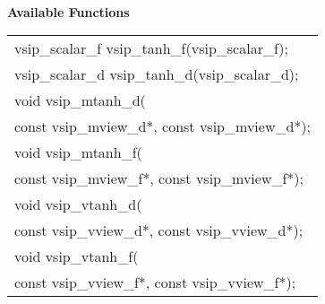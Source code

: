 \\\cvsiplh
\newline \hspace*{.8cm} \vspace*{.1cm} \textbf{Available Functions }
\newline \hspace*{1.1cm} {
\ttfamily
\begin{tabular}[H]{l}
vsip\_scalar\_f vsip\_tanh\_f(vsip\_scalar\_f);\\
vsip\_scalar\_d vsip\_tanh\_d(vsip\_scalar\_d);\\
void vsip\_mtanh\_d(\\*\hspace{1cm}const vsip\_mview\_d*, const vsip\_mview\_d*);\\
void vsip\_mtanh\_f(\\*\hspace{1cm}const vsip\_mview\_f*, const vsip\_mview\_f*);\\
void vsip\_vtanh\_d(\\*\hspace{1cm}const vsip\_vview\_d*, const vsip\_vview\_d*);\\
void vsip\_vtanh\_f(\\*\hspace{1cm}const vsip\_vview\_f*, const vsip\_vview\_f*);\\
\end{tabular}
}
\\\pyjvsiph
